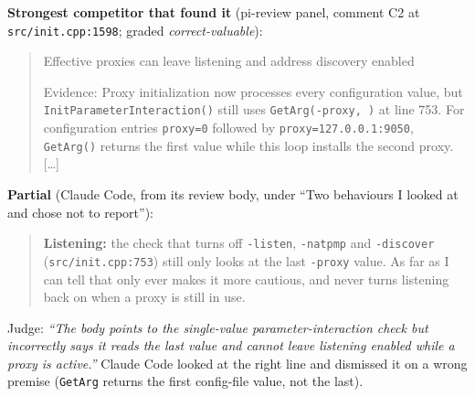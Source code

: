 \documentclass[11pt,a4paper]{article}
\newcommand{\code}[1]{\texttt{#1}}
\begin{document}
\noindent\textbf{Strongest competitor that found it} (pi-review panel, comment C2 at \code{src/\allowbreak{}init.cpp:1598}; graded \emph{correct-valuable}):
\begin{quote}\small
Effective proxies can leave listening and address discovery enabled\par Evidence: Proxy initialization now processes every configuration value, but \texttt{InitParameterInteraction()} still uses \texttt{GetArg(\textquotedbl{}-proxy\textquotedbl{}, \textquotedbl{}\textquotedbl{})} at line 753. For configuration entries \texttt{proxy=0} followed by \texttt{proxy=127.0.0.1:9050}, \texttt{GetArg()} returns the first value while this loop installs the second proxy. [\ldots]
\end{quote}
\noindent\textbf{Partial} (Claude Code, from its review body, under ``Two behaviours I looked at and chose not to report''):
\begin{quote}\small
\textbf{Listening:} the check that turns off \texttt{-listen}, \texttt{-natpmp} and \texttt{-discover} (\texttt{src/init.cpp:753}) still only looks at the last \texttt{-proxy} value. As far as I can tell that only ever makes it more cautious, and never turns listening back on when a proxy is still in use.
\end{quote}
\noindent Judge: \emph{``The body points to the single-value parameter-interaction check but incorrectly says it reads the last value and cannot leave listening enabled while a proxy is active.''}
Claude Code looked at the right line and dismissed it on a wrong premise (\code{GetArg} returns the first config-file value, not the last).
\end{document}

